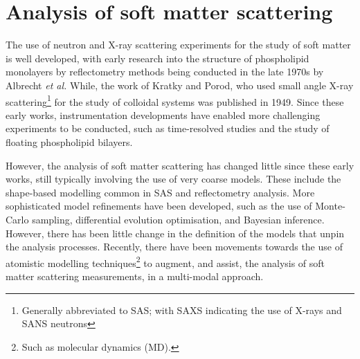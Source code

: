 \section{Analysis of soft matter scattering}
The use of neutron and X-ray scattering experiments for the study of soft matter is well developed, with early research into the structure of phospholipid monolayers by reflectometry methods being conducted in the late 1970s by Albrecht \emph{et al.}\autocite{albrecht_polymorphism_1978}
While, the work of Kratky and Porod,\autocite{kratky_diffuse_1949} who used small angle X-ray scattering\footnote{Generally abbreviated to SAS; with SAXS indicating the use of X-rays and SANS neutrons} for the study of colloidal systems was published in 1949.
Since these early works, instrumentation developments have enabled more challenging experiments to be conducted, such as time-resolved studies \autocite{jensen_monitoring_2014} and the study of floating phospholipid bilayers.\autocite{rondelli_reflectivity_2012}

However, the analysis of soft matter scattering has changed little since these early works, still typically involving the use of very coarse models.
These include the shape-based modelling common in SAS  and reflectometry analysis.
More sophisticated model refinements have been developed, such as the use of Monte-Carlo sampling,\autocite{pedersen_monte_2002} differential evolution optimisation, and Bayesian inference.\autocite{nelson_refnx_2019,larsen_analysis_2018}
However, there has been little change in the definition of the models that unpin the analysis processes.
Recently, there have been movements towards the use of atomistic modelling techniques\footnote{Such as molecular dynamics (MD).} to augment, and assist, the analysis of soft matter scattering measurements, in a multi-modal approach.\autocite{scoppola_combining_2018}


